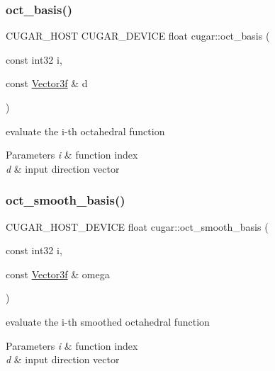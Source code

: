 \subsubsection{\texorpdfstring{oct\+\_\+basis()}{oct\_basis()}}
{\footnotesize\ttfamily C\+U\+G\+A\+R\+\_\+\+H\+O\+ST C\+U\+G\+A\+R\+\_\+\+D\+E\+V\+I\+CE float cugar\+::oct\+\_\+basis (\begin{DoxyParamCaption}\item[{const int32}]{i,  }\item[{const \hyperlink{structcugar_1_1_vector}{Vector3f} \&}]{d }\end{DoxyParamCaption})\hspace{0.3cm}{\ttfamily [inline]}}

evaluate the i-\/th octahedral function


\begin{DoxyParams}{Parameters}
{\em i} & function index \\
\hline
{\em d} & input direction vector \\
\hline
\end{DoxyParams}
\mbox{\label{group__octahedral__functions_ga71566a5a9606f7c37b4b04c9b6c8bac5}} 
\subsubsection{\texorpdfstring{oct\+\_\+smooth\+\_\+basis()}{oct\_smooth\_basis()}}
{\footnotesize\ttfamily C\+U\+G\+A\+R\+\_\+\+H\+O\+S\+T\+\_\+\+D\+E\+V\+I\+CE float cugar\+::oct\+\_\+smooth\+\_\+basis (\begin{DoxyParamCaption}\item[{const int32}]{i,  }\item[{const \hyperlink{structcugar_1_1_vector}{Vector3f} \&}]{omega }\end{DoxyParamCaption})\hspace{0.3cm}{\ttfamily [inline]}}

evaluate the i-\/th smoothed octahedral function


\begin{DoxyParams}{Parameters}
{\em i} & function index \\
\hline
{\em d} & input direction vector \\
\hline
\end{DoxyParams}
